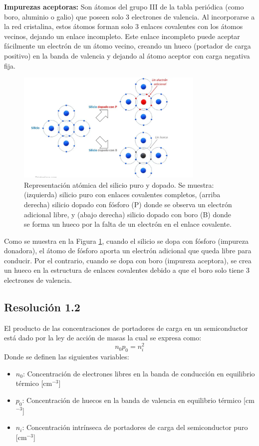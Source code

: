 \documentclass[
  11pt,
  letterpaper,
   addpoints,
   answers
  ]{exam}
\begin{document}
\begin{questions}
\begin{solution}
\textbf{Impurezas aceptoras:} Son átomos del grupo III de la tabla periódica (como boro, aluminio o galio) que poseen solo 3 electrones de valencia. Al incorporarse a la red cristalina, estos átomos forman solo 3 enlaces covalentes con los átomos vecinos, dejando un enlace incompleto. Este enlace incompleto puede aceptar fácilmente un electrón de un átomo vecino, creando un hueco (portador de carga positivo) en la banda de valencia y dejando al átomo aceptor con carga negativa fija.
\begin{figure}[H]
    \centering
    \includegraphics[width=0.8\textwidth]{../figures/Auxiliar_2_3}
    \caption{Representación atómica del silicio puro y dopado. Se muestra: (izquierda) silicio puro con enlaces covalentes completos, (arriba derecha) silicio dopado con fósforo (P) donde se observa un electrón adicional libre, y (abajo derecha) silicio dopado con boro (B) donde se forma un hueco por la falta de un electrón en el enlace covalente.}
    \label{fig:impurezas}
\end{figure}

Como se muestra en la Figura \ref{fig:impurezas}, cuando el silicio se dopa con fósforo (impureza donadora), el átomo de fósforo aporta un electrón adicional que queda libre para conducir. Por el contrario, cuando se dopa con boro (impureza aceptora), se crea un hueco en la estructura de enlaces covalentes debido a que el boro solo tiene 3 electrones de valencia.
\subsection*{Resolución 1.2}
El producto de las concentraciones de portadores de carga en un semiconductor está dado por la ley de acción de masas la cual se expresa como:
\begin{equation}
  n_0 p_0 = n_i^{2}  
\end{equation}
Donde se definen las siguientes variables:
\begin{itemize}
    \item $n_0$: Concentración de electrones libres en la banda de conducción en    equilibrio térmico [cm$^{-3}$]
    \item $p_0$: Concentración de huecos en la banda de valencia en equilibrio térmico [cm$^{-3}$]
    \item $n_i$: Concentración intrínseca de portadores de carga del semiconductor puro [cm$^{-3}$]
\end{itemize}


\end{solution}
\end{questions}
\end{document}
